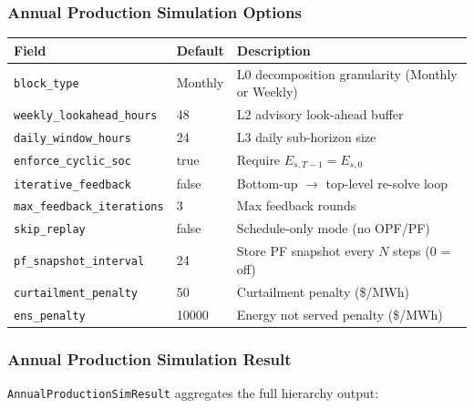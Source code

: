 \subsubsection{Annual Production Simulation Options}

\begin{center}
\begin{tabular}{lll}
\hline\hline
\textbf{Field} & \textbf{Default} & \textbf{Description} \\
\hline
\texttt{block\_type} & Monthly & L0 decomposition granularity (Monthly or Weekly) \\
\texttt{weekly\_lookahead\_hours} & 48 & L2 advisory look-ahead buffer \\
\texttt{daily\_window\_hours} & 24 & L3 daily sub-horizon size \\
\texttt{enforce\_cyclic\_soc} & true & Require $E_{s,T-1} = E_{s,0}$ \\
\texttt{iterative\_feedback} & false & Bottom-up $\to$ top-level re-solve loop \\
\texttt{max\_feedback\_iterations} & 3 & Max feedback rounds \\
\texttt{skip\_replay} & false & Schedule-only mode (no OPF/PF) \\
\texttt{pf\_snapshot\_interval} & 24 & Store PF snapshot every $N$ steps (0 = off) \\
\texttt{curtailment\_penalty} & 50 & Curtailment penalty (\$/MWh) \\
\texttt{ens\_penalty} & 10000 & Energy not served penalty (\$/MWh) \\
\hline\hline
\end{tabular}
\end{center}

\subsubsection{Annual Production Simulation Result}

\texttt{AnnualProductionSimResult} aggregates the full hierarchy output:

